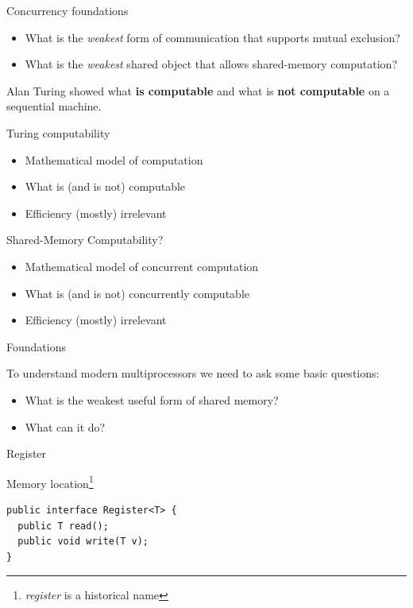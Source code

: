 \begin{frame}{Concurrency foundations}

\begin{itemize}
  \item What is the \textit{weakest} form of communication that supports mutual exclusion?
  \pause
  \item What is the \textit{weakest} shared object that allows shared-memory computation?  
\end{itemize}

\pause
Alan Turing showed what \textbf{is computable} and what is \textbf{not computable} on a sequential machine.

\pause

Turing computability
\begin{itemize}
  \item Mathematical model of computation
  \item What is (and is not) computable
  \item Efficiency (mostly) irrelevant
\end{itemize}

\pause

Shared-Memory Computability?
\pause
\begin{itemize}
  \item Mathematical model of concurrent computation
  \item What is (and is not) concurrently computable
  \item Efficiency (mostly) irrelevant
\end{itemize}

\end{frame}


\begin{frame}{Foundations}

To understand modern multiprocessors we need to ask some basic questions:
\begin{itemize}
  \pause
  \item What is the weakest useful form of shared memory?
  \pause
  \item What can it do?
\end{itemize}

\end{frame}


\begin{frame}[t, fragile]{Register}

Memory location\footnote{\textit{register} is a historical name}

\begin{verbatim}
public interface Register<T> {
  public T read();  
  public void write(T v);
}
\end{verbatim}
\end{frame}

